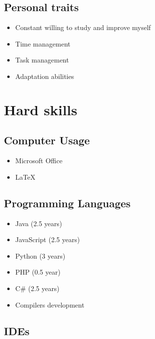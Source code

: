 \documentclass[a4paper,12pt]{article}
\begin{document}
\subsection*{Personal traits}

\begin{itemize}
    \item Constant willing to study and improve myself
    \item Time management
    \item Task management
    \item Adaptation abilities
\end{itemize}

\newpage

\section*{Hard skills}

\subsection*{Computer Usage}

\begin{itemize}
    \item Microsoft Office
    \item LaTeX 
\end{itemize}

\smallskip

\subsection*{Programming Languages}

\begin{multicols}{2}
\begin{itemize}
    \item Java (2.5 years)
    \item JavaScript (2.5 years)
    \item Python (3 years)
    \item PHP (0.5 year)
    \item C\# (2.5 years)
    \item Compilers development
\end{itemize}
\end{multicols}

\subsection*{IDEs}
\end{document}
